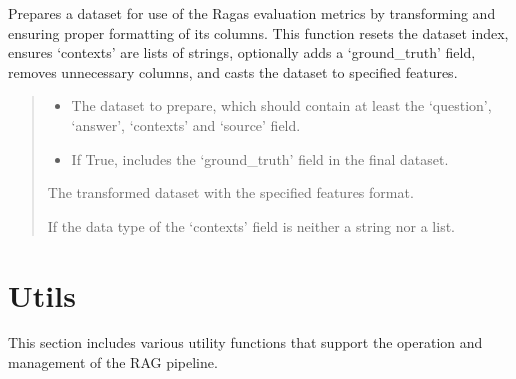 \documentclass[letterpaper,10pt,english,openany,oneside]{sphinxmanual}
\begin{document}

\begin{fulllineitems}
\label{\detokenize{evaluation:tools.pipeline.ragas_prepare_data}}
\pysigstartsignatures
{}
\pysigstopsignatures
\sphinxAtStartPar
Prepares a dataset for use of the Ragas evaluation metrics by transforming
and ensuring proper formatting of its columns. This function resets the dataset index, ensures
‘contexts’ are lists of strings, optionally adds a ‘ground\_truth’ field, removes unnecessary
columns, and casts the dataset to specified features.
\begin{quote}\begin{description}
\begin{itemize}
\item {} 
\sphinxAtStartPar
{} \textendash{} The dataset to prepare, which should contain at least the ‘question’, ‘answer’, ‘contexts’ and ‘source’ field.

\item {} 
\sphinxAtStartPar
{} \textendash{} If True, includes the ‘ground\_truth’ field in the final dataset.

\end{itemize}

\sphinxAtStartPar
The transformed dataset with the specified features format.

\sphinxAtStartPar
{} \textendash{} If the data type of the ‘contexts’ field is neither a string nor a list.

\end{description}\end{quote}

\end{fulllineitems}


\sphinxstepscope


\chapter{Utils}
\label{\detokenize{utils:utils}}\label{\detokenize{utils::doc}}
\sphinxAtStartPar
This section includes various utility functions that support the operation and management of the RAG pipeline.
\label{\detokenize{utils:module-tools.pipeline}}
\end{document}
